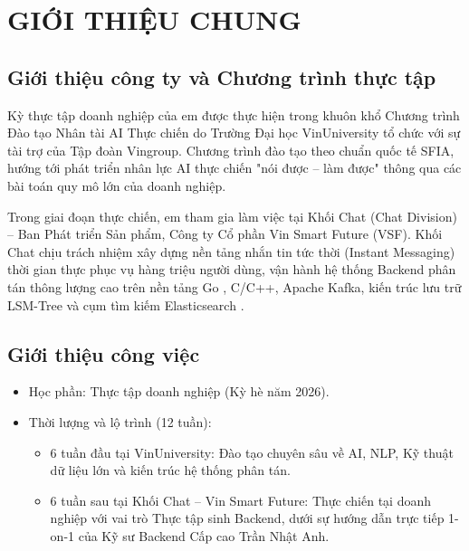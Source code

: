 \documentclass[12pt,a4paper,oneside]{report}
\begin{document}
\chapter{GIỚI THIỆU CHUNG}

\section{Giới thiệu công ty và Chương trình thực tập}
Kỳ thực tập doanh nghiệp của em được thực hiện trong khuôn khổ Chương trình Đào tạo Nhân tài AI Thực chiến do Trường Đại học VinUniversity tổ chức với sự tài trợ của Tập đoàn Vingroup. Chương trình đào tạo theo chuẩn quốc tế SFIA, hướng tới phát triển nhân lực AI thực chiến "nói được -- làm được" thông qua các bài toán quy mô lớn của doanh nghiệp.

Trong giai đoạn thực chiến, em tham gia làm việc tại Khối Chat (Chat Division) -- Ban Phát triển Sản phẩm, Công ty Cổ phần Vin Smart Future (VSF). Khối Chat chịu trách nhiệm xây dựng nền tảng nhắn tin tức thời (Instant Messaging) thời gian thực phục vụ hàng triệu người dùng, vận hành hệ thống Backend phân tán thông lượng cao trên nền tảng Go \cite{ref7}, C/C++, Apache Kafka, kiến trúc lưu trữ LSM-Tree \cite{ref3} và cụm tìm kiếm Elasticsearch \cite{ref4}.

\section{Giới thiệu công việc}
\begin{itemize}
    \item Học phần: Thực tập doanh nghiệp (Kỳ hè năm 2026).
    \item Thời lượng và lộ trình (12 tuần):
    \begin{itemize}
        \item 6 tuần đầu tại VinUniversity: Đào tạo chuyên sâu về AI, NLP, Kỹ thuật dữ liệu lớn và kiến trúc hệ thống phân tán.
        \item 6 tuần sau tại Khối Chat -- Vin Smart Future: Thực chiến tại doanh nghiệp với vai trò Thực tập sinh Backend, dưới sự hướng dẫn trực tiếp 1-on-1 của Kỹ sư Backend Cấp cao Trần Nhật Anh.
    \end{itemize}
\end{itemize}
\end{document}
